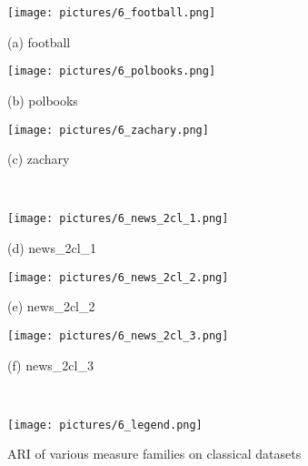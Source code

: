 \documentclass{article}
\begin{document}
\begin{figure}[H]
	\begin{minipage}{.32\textwidth}
		\texttt{[image: pictures/6\_football.png]}
		\\\centerline{(a) football}
	\end{minipage}
	\begin{minipage}{.32\textwidth}
		\texttt{[image: pictures/6\_polbooks.png]}
		\\\centerline{(b) polbooks}
	\end{minipage}
	\begin{minipage}{.32\textwidth}
		\texttt{[image: pictures/6\_zachary.png]}
		\\\centerline{(c) zachary}
	\end{minipage}
    \\[10pt]
	\begin{minipage}{.32\textwidth}
		\texttt{[image: pictures/6\_news\_2cl\_1.png]}
		\\\centerline{(d) news\_2cl\_1}
	\end{minipage}
	\begin{minipage}{.32\textwidth}
		\texttt{[image: pictures/6\_news\_2cl\_2.png]}
		\\\centerline{(e) news\_2cl\_2}
	\end{minipage}
	\begin{minipage}{.32\textwidth}
		\texttt{[image: pictures/6\_news\_2cl\_3.png]}
		\\\centerline{(f) news\_2cl\_3}
	\end{minipage}
	\\[10pt]
    \begin{minipage}{\textwidth}
        \texttt{[image: pictures/6\_legend.png]}
	\end{minipage}
  \caption{\label{f_datasets}ARI of various measure families on classical datasets}
\end{figure}
\end{document}
